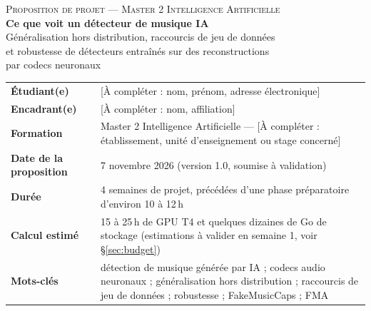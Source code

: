 \documentclass[11pt,a4paper]{article}
\newcommand{\acompleter}[1]{\textcolor{red!70!black}{[À compléter : #1]}}
\begin{document}
\begin{center}
{\large\scshape Proposition de projet --- Master 2 Intelligence Artificielle}\\[0.8em]
{\LARGE\bfseries Ce que voit un détecteur de musique IA}\\[0.5em]
{\Large Généralisation hors distribution, raccourcis de jeu de données\\ et robustesse de détecteurs entraînés sur des reconstructions\\ par codecs neuronaux}
\end{center}

\vspace{0.8em}

\begin{tabularx}{\textwidth}{@{}>{\bfseries}l X@{}}
\toprule
Étudiant(e) & \acompleter{nom, prénom, adresse électronique}\\
Encadrant(e) & \acompleter{nom, affiliation}\\
Formation & Master 2 Intelligence Artificielle --- \acompleter{établissement, unité d'enseignement ou stage concerné}\\
Date de la proposition & 7 novembre 2026 (version 1.0, soumise à validation)\\
Durée & 4 semaines de projet, précédées d'une phase préparatoire d'environ 10 à 12\,h\\
Calcul estimé & 15 à 25\,h de GPU T4 et quelques dizaines de Go de stockage (estimations à valider en semaine 1, voir \S\ref{sec:budget})\\
Mots-clés & détection de musique générée par IA ; codecs audio neuronaux ; généralisation hors distribution ; raccourcis de jeu de données ; robustesse ; FakeMusicCaps ; FMA\\
\bottomrule
\end{tabularx}

\vspace{1em}
\end{document}
